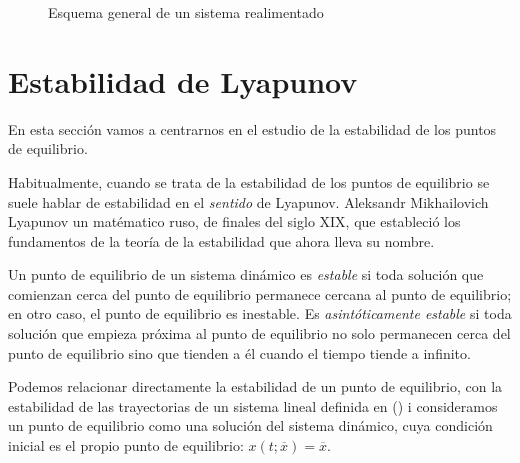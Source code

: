 \begin{figure}
\centering
{}

\caption{Esquema general de un sistema realimentado}\label{fig:rea}
\end{figure}

\section{Estabilidad de Lyapunov}
 En esta sección vamos a centrarnos en el estudio de la estabilidad de los puntos de equilibrio. 

Habitualmente, cuando se trata de la estabilidad de los puntos de equilibrio se suele hablar de estabilidad en el \emph{sentido} de Lyapunov. Aleksandr Mikhailovich Lyapunov un matématico ruso, de finales del siglo XIX, que estableció los fundamentos de la teoría de la estabilidad que ahora lleva su nombre.

Un punto de equilibrio de un sistema dinámico es \emph{estable} si toda  solución que comienzan cerca del punto de equilibrio permanece cercana al punto de equilibrio; en otro caso, el punto de equilibrio es inestable. Es \emph{asintóticamente estable} si toda solución que empieza próxima al punto de equilibrio no solo permanecen cerca del punto de equilibrio sino que tienden a él cuando el tiempo tiende a infinito.

Podemos relacionar directamente la estabilidad de un punto de equilibrio, con la estabilidad de las trayectorias de un sistema lineal definida en () i consideramos  un punto de equilibrio como una solución del sistema dinámico, cuya condición inicial es el propio punto de equilibrio: $x(t;\overline x) = \overline x$.

